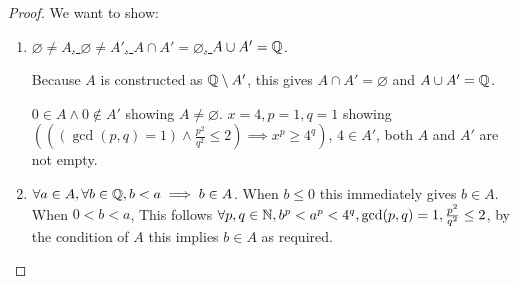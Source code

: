 \documentclass{homework}
\newcommand{\nil}{\varnothing}
\newcommand{\Q}{\bb{Q}} %
\newcommand{\N}{\bb{N}} %
\newcommand{\?}{\stackrel{?}{=}}
\theoremstyle{definition}
\begin{document}
\begin{proof}
    We want to show:
    \begin{enumerate}
        \item \underline{$\nil\neq A$, $\nil\neq A'$, $A\cap A'=\nil$, $A\cup A'=\Q$}. 
        
        






Because $A$ is constructed as $\Q\setminus A'$, this gives $A\cap A'=\nil$ and $A\cup A'=\Q$. 


$0\in A\land 0\notin A'$ showing $A\neq\nil$. $x=4, p=1, q=1$ showing $(((\gcd(p,q)=1)\land\frac{p^2}{q^2}\leq2)\implies x^p\geq4^q)$, $4\in A'$, both $A$ and $A'$ are not empty.  

        \item  \underline{$\forall a\in A, \forall b\in\Q,b<a\implies b\in A$}. When $b\leq0$ this immediately gives $b\in A$. When $0<b<a$, This follows $\forall p,q\in\N, b^p<a^p<4^q,  \gcd(p,q)=1, \frac{p^2}{q^2}\leq2$, by the condition of $A$ this implies $b\in A$ as required. 


\end{enumerate}
\end{proof}
\end{document}
